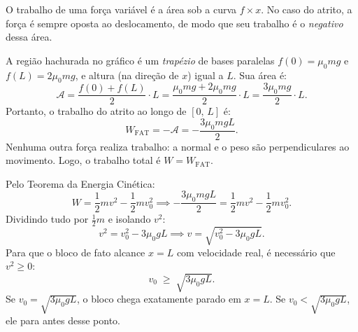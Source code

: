 \begin{exemplo}
\begin{center}
\end{center}

\bigskip

\noindent O trabalho de uma força variável é a área sob a curva
$f \times x$. No caso do atrito, a força é
sempre oposta ao deslocamento, de modo que seu trabalho é o
\emph{negativo} dessa área.

A região hachurada no gráfico é um \textit{trapézio} de bases paralelas
$f(0) = \mu_0 mg$ e $f(L) = 2\mu_0 mg$, e altura (na direção de $x$)
igual a $L$. Sua área é:
%
\begin{equation*}
    \mathcal{A} = \frac{f(0) + f(L)}{2}\cdot L
    = \frac{\mu_0 mg + 2\mu_0 mg}{2}\cdot L
    = \frac{3\mu_0 mg}{2}\cdot L.
\end{equation*}
%
Portanto, o trabalho do atrito ao longo de $[0,\, L]$ é:
%
\begin{equation*}
    W_\text{FAT} = -\mathcal{A} = -\frac{3\mu_0 mgL}{2}.
\end{equation*}
%
Nenhuma outra força realiza trabalho: a normal e o peso são
perpendiculares ao movimento. Logo, o trabalho total é $W = W_\text{FAT} $.

Pelo Teorema da Energia Cinética:
%
\begin{equation*}
    W = \frac{1}{2}mv^2 - \frac{1}{2}mv_0^2
    \implies
    -\frac{3\mu_0 mgL}{2} = \frac{1}{2}mv^2 - \frac{1}{2}mv_0^2.
\end{equation*}
%
Dividindo tudo por $\tfrac{1}{2}m$ e isolando $v^2$:
%
\begin{equation*}
    v^2 = v_0^2 - 3\mu_0 gL
    \implies
    \boxed{v = \sqrt{v_0^2 - 3\mu_0 gL}.}
\end{equation*}
%
Para que o bloco de fato alcance $x = L$ com velocidade real,
é necessário que $v^2 \geq 0$:
%
\begin{equation*}
    \boxed{v_0 \;\geq\; \sqrt{3\mu_0 gL}.}
\end{equation*}
%
Se $v_0 = \sqrt{3\mu_0 gL}$, o bloco chega exatamente parado em
$x = L$. Se $v_0 < \sqrt{3\mu_0 gL}$, ele para antes desse ponto.
\bigskip


\end{exemplo}
